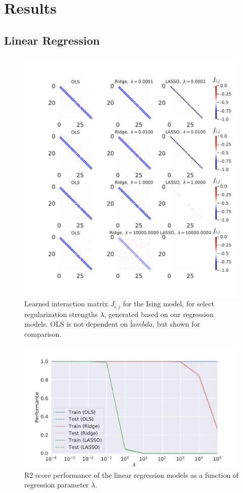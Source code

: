 \section{Results}
\subsection{Linear Regression}
\begin{figure}[H]
    \centering
\includegraphics[width = 0.7\paperwidth]{figures/regression_mehtastyle.pdf} 
    \caption{Learned interaction matrix $J_{i,j}$ for the Ising model, for select 
    regularization strengths $\lambda$, generated based on our regression models.
    OLS is not dependent on $ĺambda$, but shown for comparison.
	 } 
\label{fig:regression-mehta}
\end{figure}

\begin{figure}[H]
\centering
\includegraphics[width = 0.8\paperwidth]{figures/regression_r2.pdf}
    \caption{R2 score performance of the linear regression models as a function of
	     regression parameter $\lambda$.}
\label{fig:regression-r2}
\end{figure}


